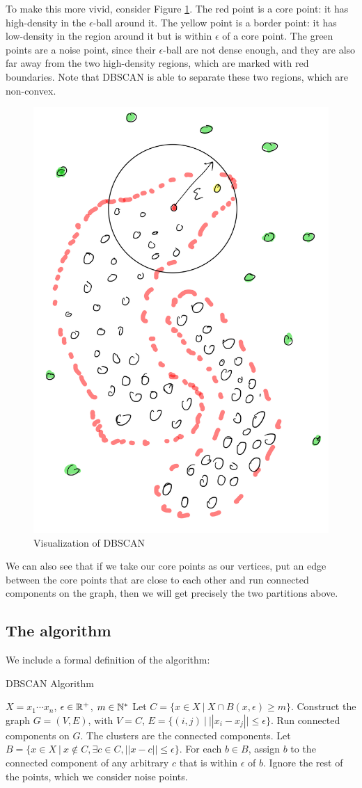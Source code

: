   To make this more vivid, consider Figure \ref{fig:dbscan}. The red point is a core point:
  it has high-density in the $\epsilon$-ball around it. The yellow point is a border
  point: it has low-density in the region around it but is within $\epsilon$ of
  a core point. The green points are a noise point, since their $\epsilon$-ball
  are not dense enough, and they are also far away from the two high-density
  regions, which are marked with red boundaries. Note that DBSCAN is able
  to separate these two regions, which are non-convex.

  \begin{figure}[h]
  \centering
  \includegraphics[width=.4\linewidth]{chapter_2/files/dbscan.png}
  \caption{Visualization of DBSCAN}
  \label{fig:dbscan}
  \end{figure}

  We can also see that if we take our core points as our vertices, put an edge between
  the core points that are close to each other and run connected components on
  the graph, then we will get precisely the two partitions above.

  \subsection{The algorithm}

  We include a formal definition of the algorithm:

  \begin{algorithm}[H]
    \caption{DBSCAN Algorithm}
    \label{dbscan alg}
    \begin{algorithmic}[1]
      \renewcommand\algorithmicrequire{\textbf{input}} 
      \REQUIRE $X = {x_1\cdots x_n}$, $\epsilon \in \mathbb{R}^+$, $m \in \mathbb{N}^*$   
      \STATE Let $C=\{x \in X \ | \ X \cap B(x, \epsilon) \geq m\}$.
      \STATE Construct the graph $G=(V,E)$, with $V=C$, $E=\{(i,j) \ | \ ||x_i-x_j|| \leq \epsilon\}$.
      \STATE Run connected components on $G$. The clusters are the connected components.
      \STATE Let $B=\{x \in X \ | \ x \notin C, \exists c \in C, ||x-c|| \leq \epsilon\}$.
      For each $b \in B$, assign $b$ to the connected component of any arbitrary $c$
      that is within $\epsilon$ of $b$.
      \STATE Ignore the rest of the points, which we consider noise points.
    \end{algorithmic}
  \end{algorithm}


